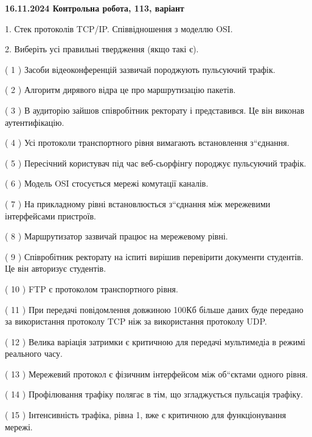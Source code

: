 \documentclass[12pt, ukrainian]{article}
\begin{document}
\vspace{4mm}
\newpage
\begin {large}

\textbf{16.11.2024 Контрольна робота, 113, варіант  }\par


{
1. Стек протоколів TCP/IP. Співвідношення з моделлю OSI.



\vspace{5mm}
2. Виберіть усі правильні твердження (якщо такі є).\par
\vspace{2mm}

( 1 ) Засоби відеоконференцій зазвичай породжують пульсуючий трафік.

( 2 ) Алгоритм дирявого відра це про маршрутизацію пакетів.

( 3 ) В аудиторію зайшов співробітник ректорату і представився. Це він виконав аутентифікацію.

( 4 ) Усі протоколи транспортного рівня вимагають встановлення з“єднання.

( 5 ) Пересічний користувач під час веб-сьорфінгу породжує пульсуючий трафік.

( 6 ) Модель OSI стосується мережі комутації каналів.

( 7 ) На прикладному рівні встановлюється з“єднання між мережевими інтерфейсами пристроїв.

( 8 ) Маршрутизатор зазвичай працює на мережевому рівні.

( 9 ) Співробітник ректорату на іспиті вирішив перевірити документи студентів. Це він авторизує студентів.

( 10 ) FTP є протоколом транспортного рівня.

( 11 ) При передачі повідомлення довжиною 100Кб більше даних буде передано за використання протоколу TCP ніж за використання протоколу UDP.

( 12 ) Велика варіація затримки є критичною для передачі мультимедіа в режимі реального часу.

( 13 ) Мережевий протокол є фізичним інтерфейсом між об“єктами одного рівня.

( 14 ) Профілювання трафіку полягає в тім, що згладжується пульсація трафіку.

( 15 ) Інтенсивність трафіка, рівна 1, вже є критичною для функціонування мережі.
}
\end {large}
\end{document}

